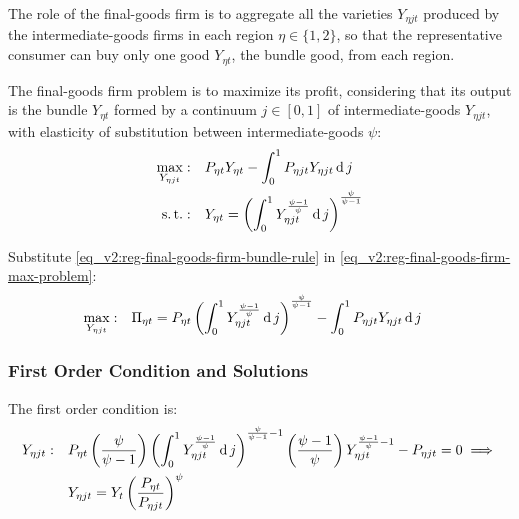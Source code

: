 \documentclass[../thesis.tex]{subfiles}
\begin{document}
The role of the final-goods firm is to aggregate all the varieties $Y_{\eta jt}$ produced by the intermediate-goods firms in each region $\eta \in \{1,2\}$, so that the representative consumer can buy only one good $Y_{\eta t}$, the bundle good, from each region.



The final-goods firm problem is to maximize its profit, considering that its output is the bundle $Y_{\eta t}$ formed by a continuum $j \in [0,1]$ of intermediate-goods $Y_{\eta jt}$, with elasticity of substitution between intermediate-goods $\psi$:
\begin{align}
	\max_{Y_{\eta jt}}: &\quad P_{\eta t} Y_{\eta t} - \int_{0}^{1} P_{\eta jt} Y_{\eta jt} \operatorname{d} j \label{eq_v2:reg-final-goods-firm-max-problem} \\
	\operatorname{s.t.}: & \quad Y_{\eta t} = \left( \int_{0}^{1} Y_{\eta jt}^{\frac{\psi-1}{\psi}} \operatorname{d} j \right)^{\frac{\psi}{\psi-1}} \label{eq_v2:reg-final-goods-firm-bundle-rule}
\end{align}

Substitute \ref{eq_v2:reg-final-goods-firm-bundle-rule} in \ref{eq_v2:reg-final-goods-firm-max-problem}:
\begin{align}
	\label{eq_v2:reg-final-goods-firm-max-problem-2}
	\max_{Y_{\eta jt}}: & \quad \Pi_{\eta t} = P_{\eta t} \left( \int_{0}^{1} Y_{\eta jt}^{\frac{\psi-1}{\psi}} \operatorname{d} j \right)^{\frac{\psi}{\psi-1}} - \int_{0}^{1} P_{\eta jt} Y_{\eta jt} \operatorname{d} j
\end{align}

\subsubsection*{First Order Condition and Solutions}

The first order condition is:
\begin{align}
	Y_{\eta jt}:\quad & P_{\eta t} \left( \frac{\psi}{\psi-1} \right) \left( \int_{0}^{1} Y_{\eta jt}^{\frac{\psi-1}{\psi}} \operatorname{d} j \right)^{\frac{\psi}{\psi-1}-1} \left( \frac{\psi-1}{\psi} \right) Y_{\eta jt}^{\frac{\psi-1}{\psi}-1} - P_{\eta jt} = 0 \implies \nonumber \\
	\label{eq_v2:reg-final-goods-firm-FOC}
	& Y_{\eta jt} = Y_{t} \left( \frac{P_{\eta t}}{P_{\eta jt}} \right)^{\psi}
\end{align}
\end{document}
